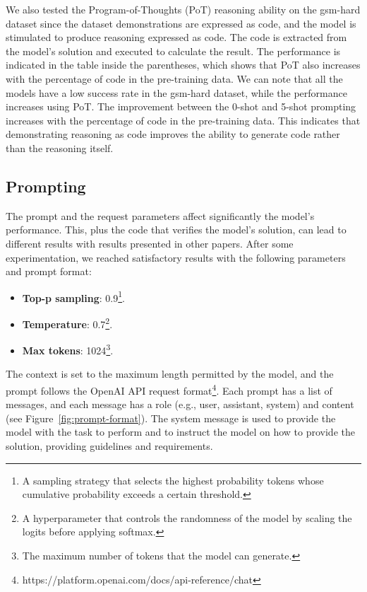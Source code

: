 We also tested the Program-of-Thoughts (PoT) reasoning ability on the gsm-hard dataset since the dataset demonstrations are expressed as code, and the model is stimulated to produce reasoning expressed as code.
The code is extracted from the model's solution and executed to calculate the result.
The performance is indicated in the table inside the parentheses, which shows that PoT also increases with the percentage of code in the pre-training data.
We can note that all the models have a low success rate in the gsm-hard dataset, while the performance increases using PoT\@.
The improvement between the 0-shot and 5-shot prompting increases with the percentage of code in the pre-training data.
This indicates that demonstrating reasoning as code improves the ability to generate code rather than the reasoning itself.

\subsection{Prompting}
\label{subsec:prompting}

The prompt and the request parameters affect significantly the model's performance.
This, plus the code that verifies the model's solution, can lead to different results with results presented in other papers.
After some experimentation, we reached satisfactory results with the following parameters and prompt format:
\begin{itemize}
	\item \textbf{Top-p sampling}: 0.9\footnote{A sampling strategy that selects the highest probability tokens whose cumulative probability exceeds a certain threshold.}.
	\item \textbf{Temperature}: 0.7\footnote{A hyperparameter that controls the randomness of the model by scaling the logits before applying softmax.}.
	\item \textbf{Max tokens}: 1024\footnote{The maximum number of tokens that the model can generate.}.
\end{itemize}
The context is set to the maximum length permitted by the model, and the prompt follows the OpenAI API request format\footnote{https://platform.openai.com/docs/api-reference/chat}.
Each prompt has a list of messages, and each message has a role (e.g., user, assistant, system) and content (see Figure~\ref{fig:prompt-format}).
The system message is used to provide the model with the task to perform and to instruct the model on how to provide the solution, providing guidelines and requirements.

